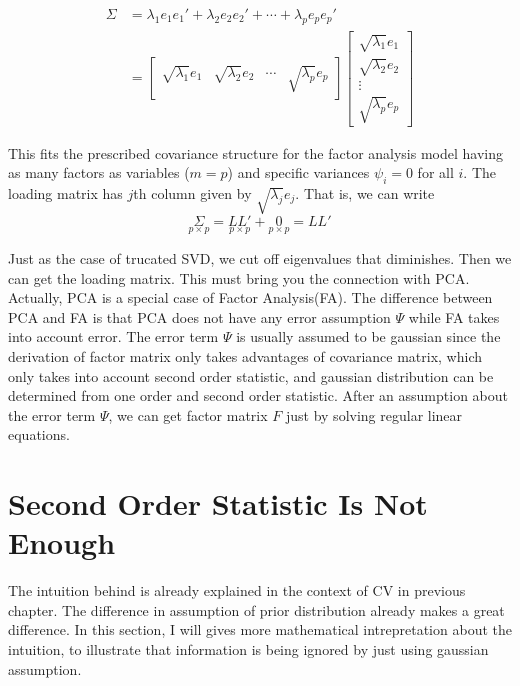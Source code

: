 \documentclass[a4paper]{book}
\begin{document}
  \begin{align*}
    \Sigma  &= \lambda_{1}e_{1}e_{1}' + \lambda_{2}e_{2}e_{2}' + \cdots +
      \lambda_{p}e_{p}e_{p}' \\
            &= 
            \begin{bmatrix}
              \sqrt{\lambda_{1}}e_{1} & \sqrt{\lambda_{2}}e_{2} & \cdots & \sqrt{\lambda_{p}}e_{p}
            \end{bmatrix}
            \begin{bmatrix}
              \sqrt{\lambda_{1}}e_{1} \\
              \sqrt{\lambda_{2}}e_{2} \\
              \vdots \\
              \sqrt{\lambda_{p}}e_{p}
            \end{bmatrix}
  \end{align*}

  This fits the prescribed covariance structure for the factor analysis model
  having as many factors as variables ($m = p$) and specific variances $\psi_{i}
  = 0$ for all $i$. The loading matrix has $j$th column given by $
  \sqrt{\lambda_{j}}e_{j}$. That is, we can write
    \begin{displaymath}
      \underset{p \times p}{\Sigma} = \underset{p \times p}{LL'} + \underset{p
        \times p}{0} = LL'
    \end{displaymath}

    Just as the case of trucated SVD, we cut off eigenvalues that diminishes.
    Then we can get the loading matrix. This must bring you the connection with
    PCA. Actually, PCA is a special case of Factor Analysis(FA). The difference
    between PCA and FA is that PCA does not have any error assumption $\Psi$
    while FA takes into account error. The error term $\Psi$ is usually assumed
    to be gaussian since the derivation of factor matrix only takes advantages
    of covariance matrix, which only takes into account second order statistic,
    and gaussian distribution can be determined from one order and second order
    statistic. After an assumption about the error term $\Psi$, we can get
    factor matrix $F$ just by solving regular linear equations.

  \section{Second Order Statistic Is Not Enough}

  The intuition behind is already explained in the context of CV in
  previous chapter. The difference in assumption of prior distribution
  already makes a great difference. In this section, I will gives more
  mathematical intrepretation about the intuition, to illustrate that
  information is being ignored by just using gaussian assumption.
\end{document}
